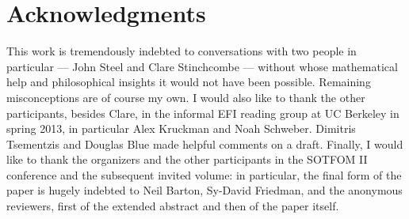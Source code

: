 \documentclass[letterpaper,12pt]{article}
\begin{document}
\section{Acknowledgments}
This work is tremendously indebted to conversations with two people in particular --- John Steel and Clare Stinchcombe --- without whose mathematical help and philosophical insights it would not have been possible. Remaining misconceptions are of course my own. I would also like to thank the other participants, besides Clare, in the informal EFI reading group at UC Berkeley in spring 2013, in particular Alex Kruckman and Noah Schweber. Dimitris Tsementzis and Douglas Blue made helpful comments on a draft. Finally, I would like to thank the organizers and the other participants in the SOTFOM II conference and the subsequent invited volume: in particular, the final form of the paper is hugely indebted to Neil Barton, Sy-David Friedman, and the anonymous reviewers, first of the extended abstract and then of the paper itself.


\end{document}
